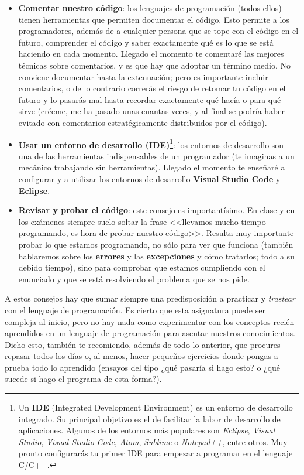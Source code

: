 \begin{itemize}
 \item \textbf{Comentar nuestro código}: los lenguajes de programación (todos ellos) tienen herramientas que permiten documentar el 
 código. Esto permite a los programadores, además de a cualquier persona que se tope con el código en el futuro, comprender el código y
 saber exactamente qué es lo que se está haciendo en cada momento. Llegado el momento te comentaré las mejores técnicas sobre comentarios, y 
 es que hay que adoptar un término medio. No conviene documentar hasta la extenuación; pero es importante incluir comentarios, o de lo contrario
 correrás el riesgo de retomar tu código en el futuro y lo pasarás mal hasta recordar exactamente qué hacía o para qué sirve (créeme, me ha
 pasado unas cuantas veces, y al final se podría haber evitado con comentarios estratégicamente distribuidos por el código).
 
 \item \textbf{Usar un entorno de desarrollo (IDE)}\footnote{Un \textbf{IDE} (Integrated Development Environment) es un entorno de desarrollo
 integrado. Su principal objetivo es el de facilitar la labor de desarrollo de aplicaciones. Algunos de los entornos más populares son
 \textit{Eclipse}, \textit{Visual Studio}, \textit{Visual Studio Code}, \textit{Atom}, \textit{Sublime} o \textit{Notepad++}, entre otros. Muy pronto configurarás tu primer IDE para
 empezar a programar en el lenguaje C/C++.}: los entornos de desarrollo son una de las herramientas indispensables de un programador 
 (te imaginas a un mecánico trabajando sin herramientas). Llegado el momento te enseñaré a configurar y a utilizar los entornos de
 desarrollo \textbf{Visual Studio Code} y \textbf{Eclipse}.
 
 \item \textbf{Revisar y probar el código}: este consejo es importantísimo. En clase y en los exámenes siempre suelo soltar la frase
 <<llevamos mucho tiempo programando, es hora de probar nuestro código>>. Resulta muy importante probar lo que estamos programando, no
 sólo para ver que funciona (también hablaremos sobre los \textbf{errores} y las \textbf{excepciones} y cómo tratarlos; todo a su debido tiempo), sino 
 para comprobar que estamos cumpliendo con el enunciado y que se está resolviendo el problema que se nos pide.
\end{itemize}

A estos consejos hay que sumar siempre una predisposición a practicar y \textit{trastear} con el lenguaje de programación. Es cierto
que esta asignatura puede ser compleja al inicio, pero no hay nada como experimentar con los conceptos recién aprendidos en un 
lenguaje de programación para asentar nuestros conocimientos. Dicho esto, también te recomiendo, además de todo lo anterior, que
procures repasar todos los días o, al menos, hacer pequeños ejercicios donde pongas a prueba todo lo aprendido (ensayos del tipo 
¿qué pasaría si hago esto? o ¿qué sucede si hago el programa de esta forma?).

